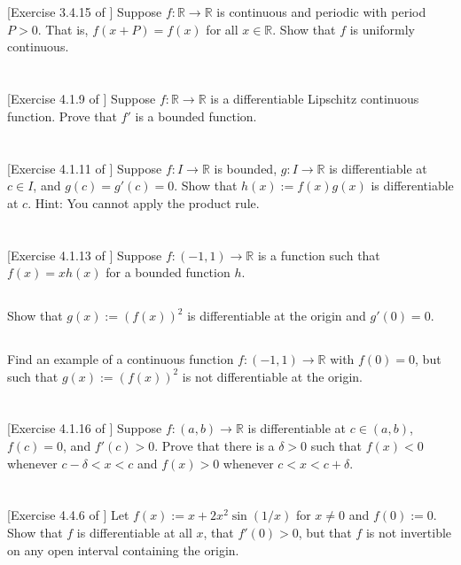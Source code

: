 \documentclass[11pt,letterpaper]{article}
\begin{document}
\section{} [Exercise 3.4.15 of \cite{Lebl_23}] 
Suppose $f:\mathbb{R}\to\mathbb{R}$ is continuous and periodic with period $P>0$. That is, $f(x+P)=f(x)$ for all $x\in\mathbb{R}$. Show that $f$ is uniformly continuous.

\section{} [Exercise 4.1.9 of \cite{Lebl_23}] 
Suppose $f:\mathbb{R}\to\mathbb{R}$ is a differentiable Lipschitz continuous function. Prove that $f'$ is a bounded function.

\section{} [Exercise 4.1.11 of \cite{Lebl_23}] 
Suppose $f:I\to\mathbb{R}$ is bounded, $g:I\to\mathbb{R}$ is differentiable at $c\in I$, and $g(c)=g'(c)=0$. Show that $h(x):=f(x)g(x)$ is differentiable at $c$. Hint: You cannot apply the product rule.

\section{} [Exercise 4.1.13 of \cite{Lebl_23}] 
Suppose $f:(-1,1)\to\mathbb{R}$ is a function such that $f(x)=xh(x)$ for a bounded function $h$.

\subsection{}
Show that $g(x):=(f(x))^2$ is differentiable at the origin and $g'(0)=0$.

\subsection{}
Find an example of a continuous function $f:(-1,1)\to\mathbb{R}$ with $f(0) = 0$, but such that $g(x):= (f(x))^2$ is not differentiable at the origin.

\section{} [Exercise 4.1.16 of \cite{Lebl_23}] 
Suppose $f:(a,b)\to\mathbb{R}$ is differentiable at $c\in(a,b)$, $f(c)=0$, and $f'(c)> 0$. Prove that there is a $\delta>0$ such that $f(x)<0$ whenever $c-\delta<x<c$ and $f(x)>0$ whenever $c<x<c+\delta$.

\section{} [Exercise 4.4.6 of \cite{Lebl_23}] 
Let $f(x):= x+2x^2\sin(1/x)$ for $x\neq 0$ and $f(0):= 0$. Show that $f$ is differentiable at all $x$, that $f'(0)>0$, but that $f$ is not invertible on any open interval containing the origin.




\vfill
\printbibliography
\end{document}
